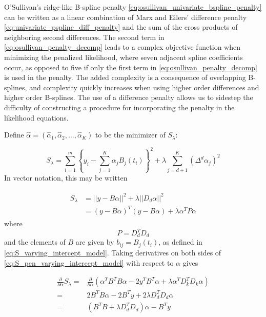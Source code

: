\documentclass[12pt]{article}
\theoremstyle{definition}
\begin{document}
O'Sullivan's ridge-like B-spline penalty \ref{eq:osullivan_univariate_bspline_penalty} can be written as a linear combination of Marx and Eilers' difference penalty \ref{eq:univariate_pspline_diff_penalty} and the sum of the cross products of neighboring second differences. The second term in \ref{eq:osullivan_penalty_decomp} leads to a complex objective function when minimizing the penalized likelihood, where seven adjacent spline coefficients occur, as opposed to five if only the first term in \ref{eq:osullivan_penalty_decomp} is used in the penalty. The added complexity is a consequence of overlapping B-splines, and complexity quickly increases when using higher order differences and higher order B-splines. The use of a difference penalty allows us to sidestep the difficulty of constructing a procedure for incorporating the penalty in the likelihood equations. 

Define $\hat{\alpha} = \left(\hat{\alpha}_1, \hat{\alpha}_2, \dots, \hat{\alpha}_K \right)$ to be the minimizer of $S_\lambda$:

\begin{equation*}  
S_\lambda = \sum_{i=1}^m \left\{ y_i - \sum_{j=1}^K \alpha_j B_j\left(t_i\right) \right\}^2 + \lambda \sum_{j=d+1}^K \left( \Delta^d\alpha_j \right)^2
\end{equation*}
\noindent
In vector notation, this may be written

\begin{align}
\begin{split}
S_\lambda &= \vert \vert y- B\alpha  \vert \vert^2  + \lambda \vert \vert D_d \alpha\vert \vert^2 \\
&=  \left( y- B\alpha  \right)^T \left( y-B \alpha\right) + \lambda \alpha^T P \alpha
\end{split} \label{eq:S_pen_varying_intercept_model}
\end{align}
\noindent
where 
\[
P = D_d^T D_d
\]
\noindent
and the elements of $B$ are given by $b_{ij} = B_j\left(t_i\right)$, as defined in \ref{eq:S_varying_intercept_model}. Taking derivatives on both sides of \ref{eq:S_pen_varying_intercept_model} with respect to $\alpha$ gives

\begin{align}
\frac{\partial}{\partial \alpha}S_\lambda ={} & \frac{\partial}{\partial \alpha}\left(\alpha^TB^TB \alpha -2y^T B^T\alpha+\lambda \alpha^T D_k^T D_k \alpha  \right) \nonumber \\
= {} & 2B^TB \alpha - 2B^T y + 2\lambda D_d^TD_d\alpha \nonumber\\
= {} & \left(B^T B +  \lambda D_d^TD_d\right)\alpha - B^T y \label{eq:dSlambda_dAlpha}
\end{align} 
\noindent
\end{document}
